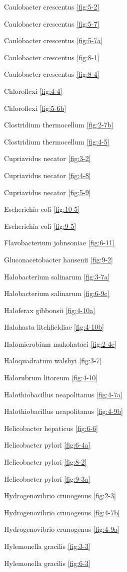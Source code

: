 \documentclass[]{tufte-book}
\begin{document}
Caulobacter crescentus \ref{fig:5-2}

Caulobacter crescentus \ref{fig:5-7}

Caulobacter crescentus \ref{fig:5-7a}

Caulobacter crescentus \ref{fig:8-1}

Caulobacter crescentus \ref{fig:8-4}

Chloroflexi \ref{fig:4-4}

Chloroflexi \ref{fig:5-6b}

Clostridium thermocellum \ref{fig:2-7b}

Clostridium thermocellum \ref{fig:4-5}

Cupriavidus necator \ref{fig:3-2}

Cupriavidus necator \ref{fig:4-8}

Cupriavidus necator \ref{fig:5-9}

Escherichia coli \ref{fig:10-5}

Escherichia coli \ref{fig:9-5}

Flavobacterium johnsoniae \ref{fig:6-11}

Gluconacetobacter hansenii \ref{fig:9-2}

Halobacterium salinarum \ref{fig:3-7a}

Halobacterium salinarum \ref{fig:6-9c}

Haloferax gibbonsii \ref{fig:4-10a}

Halohasta litchfieldiae \ref{fig:4-10b}

Halomicrobium mukohataei \ref{fig:2-4e}

Haloquadratum walsbyi \ref{fig:3-7}

Halorubrum litoreum \ref{fig:4-10}

Halothiobacillus neapolitanus \ref{fig:4-7a}

Halothiobacillus neapolitanus \ref{fig:4-9b}

Helicobacter hepaticus \ref{fig:6-6}

Helicobacter pylori \ref{fig:6-4a}

Helicobacter pylori \ref{fig:8-2}

Helicobacter pylori \ref{fig:9-3a}

Hydrogenovibrio crunogenus \ref{fig:2-3}

Hydrogenovibrio crunogenus \ref{fig:4-7b}

Hydrogenovibrio crunogenus \ref{fig:4-9a}

Hylemonella gracilis \ref{fig:3-3}

Hylemonella gracilis \ref{fig:6-3}
\end{document}
